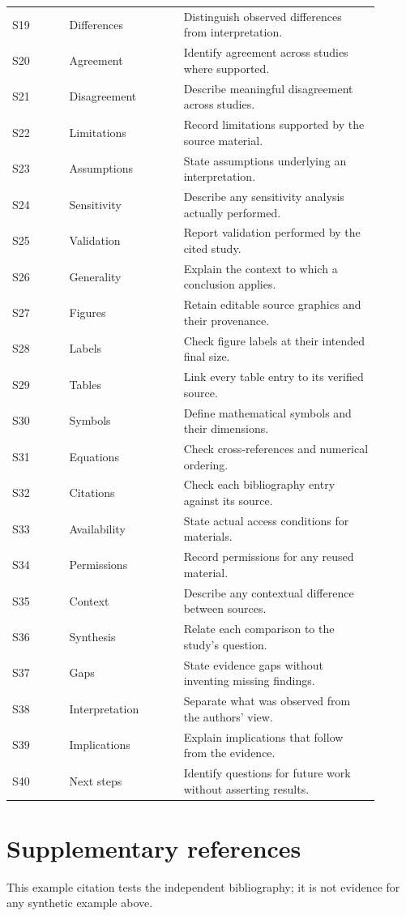 \documentclass[11pt,letterpaper]{article}
\begin{document}
\begin{longtable}{@{}p{0.14\linewidth}p{0.28\linewidth}p{0.48\linewidth}@{}}
S19 & Differences & Distinguish observed differences from interpretation.\\
S20 & Agreement & Identify agreement across studies where supported.\\
S21 & Disagreement & Describe meaningful disagreement across studies.\\
S22 & Limitations & Record limitations supported by the source material.\\
S23 & Assumptions & State assumptions underlying an interpretation.\\
S24 & Sensitivity & Describe any sensitivity analysis actually performed.\\
S25 & Validation & Report validation performed by the cited study.\\
S26 & Generality & Explain the context to which a conclusion applies.\\
S27 & Figures & Retain editable source graphics and their provenance.\\
S28 & Labels & Check figure labels at their intended final size.\\
S29 & Tables & Link every table entry to its verified source.\\
S30 & Symbols & Define mathematical symbols and their dimensions.\\
S31 & Equations & Check cross-references and numerical ordering.\\
S32 & Citations & Check each bibliography entry against its source.\\
S33 & Availability & State actual access conditions for materials.\\
S34 & Permissions & Record permissions for any reused material.\\
S35 & Context & Describe any contextual difference between sources.\\
S36 & Synthesis & Relate each comparison to the study's question.\\
S37 & Gaps & State evidence gaps without inventing missing findings.\\
S38 & Interpretation & Separate what was observed from the authors' view.\\
S39 & Implications & Explain implications that follow from the evidence.\\
S40 & Next steps & Identify questions for future work without asserting results.\\
\end{longtable}
\normalsize

\section{Supplementary references}
This example citation tests the independent bibliography\cite{wilkinson2016fair};
it is not evidence for any synthetic example above.

\end{document}
